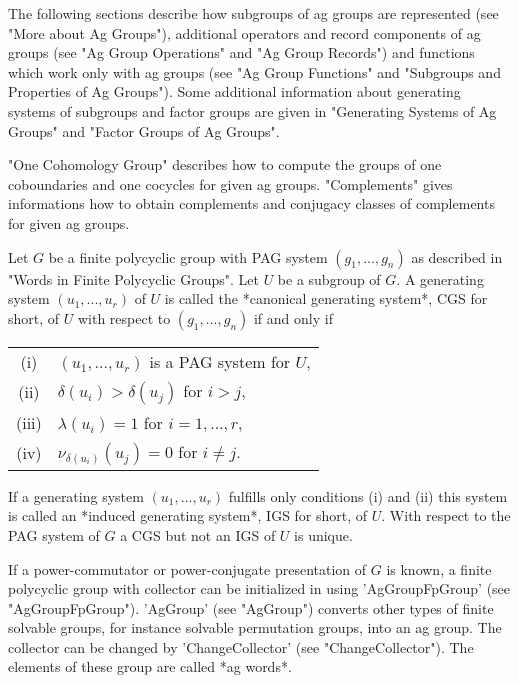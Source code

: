 The   following  sections describe  how   subgroups  of  ag   groups  are
represented (see "More about Ag Groups"), additional operators and record
components   of  ag groups   (see  "Ag Group  Operations"  and  "Ag Group
Records") and functions  which work only with ag  groups (see  "Ag  Group
Functions" and "Subgroups and Properties of Ag Groups").  Some additional
information about generating systems of  subgroups and factor  groups are
given  in "Generating Systems of  Ag  Groups" and  "Factor  Groups  of Ag
Groups".

"One Cohomology  Group"  describes  how to  compute  the groups    of one
coboundaries and one cocycles for  given ag groups.   "Complements" gives
informations how   to   obtain complements  and    conjugacy  classes  of
complements for given ag groups.



Let $G$ be a finite polycyclic group with PAG system $(g_1, ..., g_n)$ as
described in "Words in Finite Polycyclic Groups".   Let $U$ be a subgroup
of $G$.   A generating system  $(u_1, ...,  u_r)$ of  $U$ is   called the
*canonical generating  system*, CGS for  short,   of $U$ with respect  to
$(g_1, ..., g_n)$ if and only if

\begin{center}\begin{tabular}{cl}
  (i) & $(u_1, ..., u_r)$ is a PAG system for $U$, \\
 (ii) & $\delta( u_i ) >  \delta( u_j )$ for $i > j$, \\
(iii) & $\lambda( u_i ) = 1$ for $i = 1, ..., r$, \\
 (iv) & $\nu_{\delta(u_i)}(u_j) =  0$ for $i \neq j$. \\
\end{tabular}\end{center}

If a generating system $(u_1, ..., u_r)$ fulfills only conditions (i) and
(ii) this system is called an *induced generating system*, IGS for short,
of $U$.  With respect to the PAG system of $G$ a CGS  but  not an  IGS of
$U$ is unique.

If a power-commutator or power-conjugate presentation of  $G$ is known, a
finite polycyclic group with collector can be initialized in {\GAP} using
'AgGroupFpGroup'    (see  "AgGroupFpGroup").  'AgGroup'  (see  "AgGroup")
converts other  types of finite  solvable  groups,  for instance solvable
permutation groups, into an  ag group.  The  collector  can be changed by
'ChangeCollector' (see  "ChangeCollector").  The elements of  these group
are called *ag words*.

